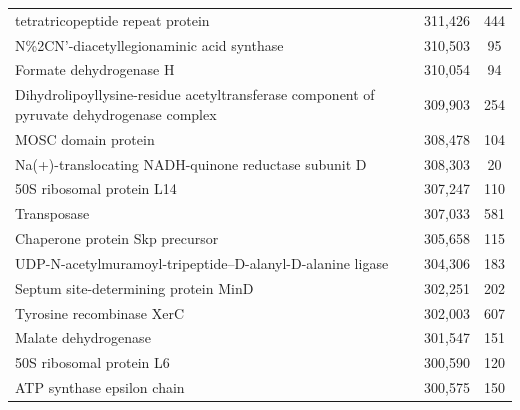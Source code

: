 \begin{singlespace}
\begin{longtable}{p{} cc}
                                                          tetratricopeptide repeat protein &                     311,426 &           444 \\
                                                 N\%2CN'-diacetyllegionaminic acid synthase &                     310,503 &            95 \\
                                                                   Formate dehydrogenase H &                     310,054 &            94 \\
 Dihydrolipoyllysine-residue acetyltransferase component of pyruvate dehydrogenase complex &                     309,903 &           254 \\
                                                                       MOSC domain protein &                     308,478 &           104 \\
                                      Na(+)-translocating NADH-quinone reductase subunit D &                     308,303 &            20 \\
                                                                 50S ribosomal protein L14 &                     307,247 &           110 \\
                                                                               Transposase &                     307,033 &           581 \\
                                                           Chaperone protein Skp precursor &                     305,658 &           115 \\
                                UDP-N-acetylmuramoyl-tripeptide--D-alanyl-D-alanine ligase &                     304,306 &           183 \\
                                                      Septum site-determining protein MinD &                     302,251 &           202 \\
                                                                 Tyrosine recombinase XerC &                     302,003 &           607 \\
                                                                      Malate dehydrogenase &                     301,547 &           151 \\
                                                                  50S ribosomal protein L6 &                     300,590 &           120 \\
                                                                ATP synthase epsilon chain &                     300,575 &           150 \\

\end{longtable}
\end{singlespace}
